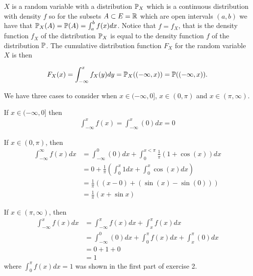 

$ X$ is a random variable with a distribution $ \P_{X} $ which is a continuous distribution with
density $ f$ so for the subsets $ A \subset E = \R$ which are open intervals $ (a,b)$ we
have that $ \P_{X}(A)  = \P(A) = \int_{a}^{b} f(x) dx$. 
Notice that $ f = f_{X} $, that is the density function  $ f_{X} $ of the distribution
$ \P_{X} $ is equal to the density function $ f $ of the distribution $ \P$.
The cumulative distribution function $ F_{X}
$ for the random variable $ X$ is then 

\[
    F_{X} (x) = \int_{-\infty}^{x} f_{X} (y) dy = \P_{X}((-\infty,x)) = \P((-\infty, x))
.\] 

We have three cases to consider when $ x \in (-\infty, 0]$, $ x \in (0, \pi) $ and $ x \in (\pi, \infty)$. 

If $ x \in (-\infty, 0] $ then 
\begin{align*}
    \int_{-\infty}^{x} f(x) = \int_{-\infty}^{x} (0) dx = 0
\end{align*}

If $ x \in (0, \pi) $, then 
\begin{align*}
    \int_{-\infty}^{\infty}f(x) dx &= \int_{-\infty}^{0} (0) dx + \int_{0}^{x<\pi} \frac{1}{\pi}
    (1+ \cos(x))dx\\
				   &= 0 + \frac{1}{\pi} \left( \int_{0}^{x} 1 dx + \int_{0}^{x}
				   \cos(x)dx \right)\\
				   &= \frac{1}{\pi} \left( (x-0) + (\sin(x)- \sin(0))  \right) \\
				   &= \frac{1}{\pi} (x+ \sin x) 
\end{align*}

If $ x \in (\pi , \infty)$, then
\begin{align*}
    \int_{-\infty}^{x} f(x) dx &= \int_{-\infty}^{\pi} f(x) dx+ \int_{x}^{\pi}f(x) dx\\
			       &= \int_{-\infty}^{0} (0) dx + \int_{0}^{\pi} f(x) dx +
			       \int_{x}^{\pi} (0) dx \\
			       &= 0 + 1 + 0\\
			       &= 1
\end{align*}
where $ \int_{0}^{\pi} f(x) dx = 1$ was shown in the first part of exercise 2. 










